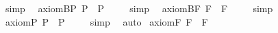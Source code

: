 \begin{isabellebody}
\ simp\ \isamarkupfalse%
%
\endisatagproof
{\isafoldproof}%
%
\isadelimproof
%
\endisadelimproof
\isanewline
\isanewline
{}\isamarkupfalse%
\ axiom{\isacharunderscore}B{\isacharunderscore}P{\isacharcolon}\ {\isachardoublequoteopen}{\isacharbrackleft}{\isasymphi}\isactrlsup P\ \isactrlbold {\isasymrightarrow}\ \isactrlbold {\isasymbox}{\isacharparenleft}\isactrlbold {\isasymdiamond}{\isacharparenleft}{\isasymphi}\isactrlsup P{\isacharparenright}{\isacharparenright}{\isacharbrackright}\ {\isacharequal}\ {\isasymtop}{\isachardoublequoteclose}%
\isadelimproof
\ %
\endisadelimproof
%
\isatagproof
{}\isamarkupfalse%
\ simp\ \isamarkupfalse%
%
\endisatagproof
{\isafoldproof}%
%
\isadelimproof
%
\endisadelimproof
\isanewline
{}\isamarkupfalse%
\ axiom{\isacharunderscore}B{\isacharunderscore}F{\isacharcolon}\ {\isachardoublequoteopen}{\isacharbrackleft}{\isasymphi}\isactrlsup F\ \isactrlbold {\isasymrightarrow}\ \isactrlbold {\isasymbox}{\isacharparenleft}\isactrlbold {\isasymdiamond}{\isacharparenleft}{\isasymphi}\isactrlsup F{\isacharparenright}{\isacharparenright}{\isacharbrackright}\ {\isacharequal}\ {\isasymtop}{\isachardoublequoteclose}%
\isadelimproof
\ %
\endisadelimproof
%
\isatagproof
{}\isamarkupfalse%
\ simp\ \isamarkupfalse%
%
\endisatagproof
{\isafoldproof}%
%
\isadelimproof
%
\endisadelimproof
\isanewline
\isanewline
{}\isamarkupfalse%
\ axiom{\isacharunderscore}{}{\isacharunderscore}P{\isacharcolon}\ {\isachardoublequoteopen}{\isacharbrackleft}\isactrlbold {\isasymbox}{\isacharparenleft}{\isasymphi}\isactrlsup P{\isacharparenright}\ \isactrlbold {\isasymrightarrow}\ \isactrlbold {\isasymdiamond}{\isacharparenleft}{\isasymphi}\isactrlsup P{\isacharparenright}{\isacharbrackright}\ {\isacharequal}\ {\isasymtop}{\isachardoublequoteclose}%
\isadelimproof
\ %
\endisadelimproof
%
\isatagproof
{}\isamarkupfalse%
\ simp\ \isamarkupfalse%
\ auto%
\endisatagproof
{\isafoldproof}%
%
\isadelimproof
%
\endisadelimproof
\isanewline
{}\isamarkupfalse%
\ axiom{\isacharunderscore}{}{\isacharunderscore}F{\isacharcolon}\ {\isachardoublequoteopen}{\isacharbrackleft}\isactrlbold {\isasymbox}{\isacharparenleft}{\isasymphi}\isactrlsup F{\isacharparenright}\ \isactrlbold {\isasymrightarrow}\ \isactrlbold {\isasymdiamond}{\isacharparenleft}{\isasymphi}\isactrlsup F{\isacharparenright}{\isacharbrackright}\ {\isacharequal}\ {\isasymtop}{\isachardoublequoteclose}%
\isadelimproof

\end{isabellebody}
